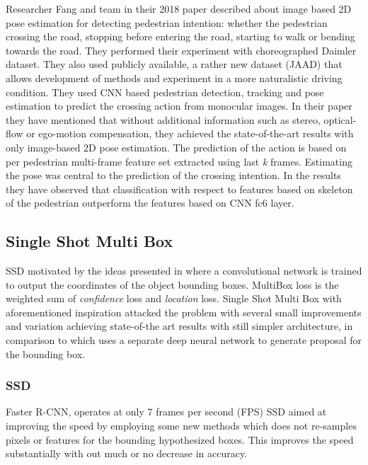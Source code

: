 \newpara
Researcher Fang and team in their 2018 paper \cite{fang2018pedestrian} described about image based 2D pose estimation for detecting pedestrian intention: whether the pedestrian crossing the road, stopping before entering the road, starting to walk or bending towards the road. They performed their experiment with choreographed Daimler dataset. They also used publicly available, a rather new dataset (JAAD) \cite{kotseruba2016joint} that allows development of methods and experiment in a more naturalistic driving condition. They used CNN based pedestrian detection, tracking and pose estimation to predict the crossing action from monocular images. In their paper they have mentioned that without additional information such as stereo, optical-flow or ego-motion compensation, they achieved the state-of-the-art results with only image-based 2D pose estimation. The prediction of the action is based on per pedestrian multi-frame feature set extracted using last \textit{k} frames. Estimating the pose was central to the prediction of the crossing intention. In the results they have observed that classification with respect to features based on  skeleton of the pedestrian outperform the features based on CNN fc6 layer.

\subsection{Single Shot Multi Box}
SSD motivated by the ideas presented in \cite{szegedy2014scalable} where a convolutional network is trained to output the coordinates of the object bounding boxes. MultiBox loss is the weighted sum of \textit{confidence} loss and \textit{location} loss. Single Shot Multi Box with aforementioned inspiration attacked the problem with several small improvements and variation achieving state-of-the art results with still simpler architecture, in comparison to \cite{szegedy2014scalable} which uses a separate deep neural network to generate proposal for the bounding box.
\subsubsection{SSD}
Faster R-CNN, operates at only 7 frames per second (FPS) SSD aimed at improving the speed by employing some new methods which does not re-samples pixels or features for the bounding hypothesized boxes. This improves the speed substantially with out much or no decrease in accuracy. 

